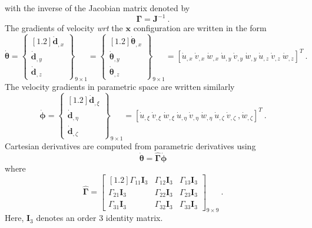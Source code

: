 \documentclass[11pt]{report}
\numberwithin{equation}{section}
\newcommand{\bmf } {\boldsymbol }  %
\newcommand{\ti}{\emph}
\newcommand{\nid}{\noindent}
\begin{document}
%
\nid with the inverse of the Jacobian matrix denoted by
%
\begin{equation}\label{E:CDe}
\mathbf{\Gamma} = \mathbf{J}^{-1}\ .
\end{equation}
%
\nid The gradients of velocity \ti{wrt} the $\bmf{x}$ configuration are written in the form
%
\begin{equation}\label{E:CDf}
\dot{\bmf{\theta}} = \begin{Bmatrix}[1.2]
\dot{ \bmf{d}}_{,x}  \\ 
\dot{ \bmf{d}}_{,y}   \\ 
\dot{ \bmf{d}}_{,z} 
 \end{Bmatrix}_{9\times 1} =  \begin{Bmatrix}[1.2]
\dot{ \bmf{\theta}}_{,x}  \\ 
\dot{ \bmf{\theta}}_{,y}    \\ 
\dot{ \bmf{\theta}}_{,z}  
 \end{Bmatrix}_{9\times 1} = \left [ \dot{u}_{,x} \  \dot{v}_{,x}\ \dot{w}_{,x}   \ 
 \dot{u}_{,y} \   \dot{v}_{,y} \  \dot{w}_{,y} \ 
 \dot{u}_{,z} \   \dot{v}_{,z} \  \dot{w}_{,z} 
  \right    ]^T \ .
\end{equation}
%
\nid The velocity gradients in parametric space are written similarly
%
\begin{equation}\label{E:CDg}
\dot{\bmf{\phi}} = \begin{Bmatrix}[1.2]
\dot{ \bmf{d}}_{,\xi}  \\ 
\dot{ \bmf{d}}_{,\eta}   \\ 
\dot{ \bmf{d}}_{,\zeta} 
 \end{Bmatrix}_{9\times 1} =   \left [ \dot{u}_{,\xi} \   \dot{v}_{,\xi}\  \dot{w}_{,\xi}   \ 
 \dot{u}_{,\eta} \   \dot{v}_{,\eta} \  \dot{w}_{,\eta} \ 
 \dot{u}_{,\zeta} \   \dot{v}_{,\zeta} \ , \dot{w}_{,\zeta} 
  \right    ]^T\ .
\end{equation}
%
Cartesian derivatives are computed from parametric derivatives using
%
\begin{equation}\label{E:CDh}
\dot{\bmf{\theta}} = \hat {\mathbf{\Gamma}} \dot{ \bmf{\phi}}
\end{equation}
%
\nid where
%
\begin{equation}\label{E:CDi}
\hat{\mathbf{\Gamma} }= \begin{bmatrix}[1.2]
 \Gamma_{11}\mathbf{I}_3  & \Gamma_{12}\mathbf{I}_3  &\Gamma_{13}\mathbf{I}_3  \\ 
 \Gamma_{21}\mathbf{I}_3  & \Gamma_{22}\mathbf{I}_3  &\Gamma_{23}\mathbf{I}_3  \\ 
 \Gamma_{31}\mathbf{I}_3  & \Gamma_{32}\mathbf{I}_3  &\Gamma_{33}\mathbf{I}_3 
  \end{bmatrix}_{9\times 9} \ .
\end{equation}
%
\nid Here, $\mathbf{I}_3$  denotes an order 3 identity matrix. 
\end{document}
